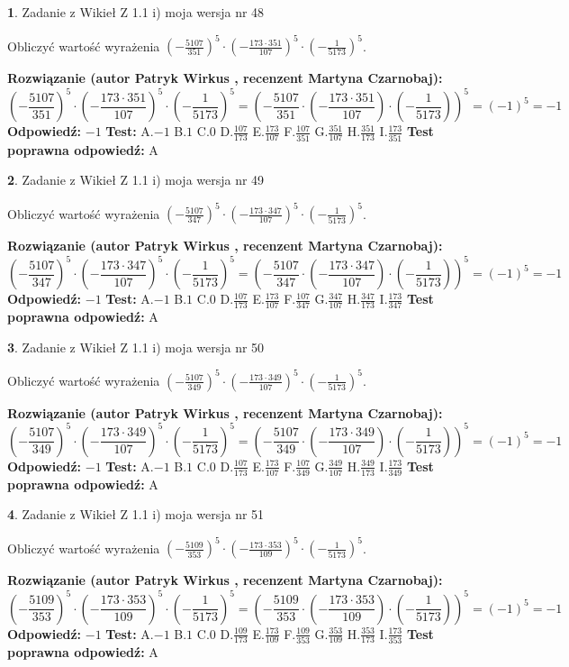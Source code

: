 \documentclass[12pt, a4paper]{article}
\theoremstyle{definition} %
\newtheorem{zad}{}
\newcommand{\zadStart}[1]{\begin{zad}#1\newline}
\newcommand{\zadStop}{\end{zad}}
\newcommand{\rozwStart}[2]{\noindent \textbf{Rozwiązanie (autor #1 , recenzent #2): }\newline}
\newcommand{\rozwStop}{\newline}
\newcommand{\odpStart}{\noindent \textbf{Odpowiedź:}\newline}
\newcommand{\odpStop}{\newline}
\newcommand{\testStart}{\noindent \textbf{Test:}\newline}
\newcommand{\testStop}{\newline}
\newcommand{\kluczStart}{\noindent \textbf{Test poprawna odpowiedź:}\newline}
\newcommand{\kluczStop}{\newline}
\begin{document}
\zadStart{Zadanie z Wikieł Z 1.1 i) moja wersja nr 48}

Obliczyć wartość wyrażenia $(-\frac{5107}{351})^{5} \cdot (-\frac{173 \cdot 351}{107})^{5} \cdot (-\frac{1}{5173})^{5}$.
\zadStop
\rozwStart{Patryk Wirkus}{Martyna Czarnobaj}
$$(-\frac{5107}{351})^{5} \cdot (-\frac{173 \cdot 351}{107})^{5} \cdot (-\frac{1}{5173})^{5} = (-\frac{5107}{351} \cdot (-\frac{173 \cdot 351}{107}) \cdot (-\frac{1}{5173}))^{5} = (-1)^{5} = -1$$
\rozwStop
\odpStart
$-1$
\odpStop
\testStart
A.$-1$ B.$1$ C.$0$ D.$\frac{107}{173}$ E.$\frac{173}{107}$
F.$\frac{107}{351}$ G.$\frac{351}{107}$
H.$\frac{351}{173}$
I.$\frac{173}{351}$
\testStop
\kluczStart
A
\kluczStop



\zadStart{Zadanie z Wikieł Z 1.1 i) moja wersja nr 49}

Obliczyć wartość wyrażenia $(-\frac{5107}{347})^{5} \cdot (-\frac{173 \cdot 347}{107})^{5} \cdot (-\frac{1}{5173})^{5}$.
\zadStop
\rozwStart{Patryk Wirkus}{Martyna Czarnobaj}
$$(-\frac{5107}{347})^{5} \cdot (-\frac{173 \cdot 347}{107})^{5} \cdot (-\frac{1}{5173})^{5} = (-\frac{5107}{347} \cdot (-\frac{173 \cdot 347}{107}) \cdot (-\frac{1}{5173}))^{5} = (-1)^{5} = -1$$
\rozwStop
\odpStart
$-1$
\odpStop
\testStart
A.$-1$ B.$1$ C.$0$ D.$\frac{107}{173}$ E.$\frac{173}{107}$
F.$\frac{107}{347}$ G.$\frac{347}{107}$
H.$\frac{347}{173}$
I.$\frac{173}{347}$
\testStop
\kluczStart
A
\kluczStop



\zadStart{Zadanie z Wikieł Z 1.1 i) moja wersja nr 50}

Obliczyć wartość wyrażenia $(-\frac{5107}{349})^{5} \cdot (-\frac{173 \cdot 349}{107})^{5} \cdot (-\frac{1}{5173})^{5}$.
\zadStop
\rozwStart{Patryk Wirkus}{Martyna Czarnobaj}
$$(-\frac{5107}{349})^{5} \cdot (-\frac{173 \cdot 349}{107})^{5} \cdot (-\frac{1}{5173})^{5} = (-\frac{5107}{349} \cdot (-\frac{173 \cdot 349}{107}) \cdot (-\frac{1}{5173}))^{5} = (-1)^{5} = -1$$
\rozwStop
\odpStart
$-1$
\odpStop
\testStart
A.$-1$ B.$1$ C.$0$ D.$\frac{107}{173}$ E.$\frac{173}{107}$
F.$\frac{107}{349}$ G.$\frac{349}{107}$
H.$\frac{349}{173}$
I.$\frac{173}{349}$
\testStop
\kluczStart
A
\kluczStop



\zadStart{Zadanie z Wikieł Z 1.1 i) moja wersja nr 51}

Obliczyć wartość wyrażenia $(-\frac{5109}{353})^{5} \cdot (-\frac{173 \cdot 353}{109})^{5} \cdot (-\frac{1}{5173})^{5}$.
\zadStop
\rozwStart{Patryk Wirkus}{Martyna Czarnobaj}
$$(-\frac{5109}{353})^{5} \cdot (-\frac{173 \cdot 353}{109})^{5} \cdot (-\frac{1}{5173})^{5} = (-\frac{5109}{353} \cdot (-\frac{173 \cdot 353}{109}) \cdot (-\frac{1}{5173}))^{5} = (-1)^{5} = -1$$
\rozwStop
\odpStart
$-1$
\odpStop
\testStart
A.$-1$ B.$1$ C.$0$ D.$\frac{109}{173}$ E.$\frac{173}{109}$
F.$\frac{109}{353}$ G.$\frac{353}{109}$
H.$\frac{353}{173}$
I.$\frac{173}{353}$
\testStop
\kluczStart
A
\kluczStop
\end{document}
